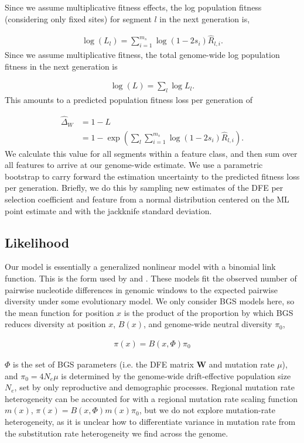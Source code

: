\documentclass[11pt]{article}
\begin{document}
Since we assume multiplicative fitness effects, the log population fitness
(considering only fixed sites) for segment $l$ in the next generation is,

\begin{align}
    \log(L_{l}) = \sum_{i=1}^{m_s} \log(1-2 s_i) \widehat{R}_{l,i}.
\end{align}
%
Since we assume multiplicative fitness, the total genome-wide log population
fitness in the next generation is

\begin{align}
    \log(L) = \sum_{l} \log{L_l}.
\end{align}
%
This amounts to a predicted population fitness loss per generation of

\begin{align}
    \widehat{\Delta}_W &= 1 - L \\  \nonumber
             &= 1 - \exp\left(\sum_{l} \sum_{i=1}^{m_s} \log(1-2s_i) \widehat{R}_{l,i} \right).
\end{align}
%
We calculate this value for all segments within a feature class, and then sum
over all features to arrive at our genome-wide estimate. We use a parametric
bootstrap to carry forward the estimation uncertainty to the predicted fitness
loss per generation. Briefly, we do this by sampling new estimates of the DFE
per selection coefficient and feature from a normal distribution centered on
the ML point estimate and with the jackknife standard deviation.

\subsection{Likelihood}
\label{supp:likelihood}

Our model is essentially a generalized nonlinear model with a binomial link
function. This is the form used by \textcite{Elyashiv2016-vt} and
\textcite{Murphy2022-sj}. These models fit the observed number of pairwise
nucleotide differences in genomic windows to the expected pairwise diversity
under some evolutionary model. We only consider BGS models here, so the mean
function for position $x$ is the product of the proportion by which BGS reduces
diversity at position $x$, $B(x)$, and genome-wide neutral diversity $\pi_0$,

\begin{align}
  \pi(x) = B(x, \Phi) \pi_0
\end{align}

$\Phi$ is the set of BGS parameters (i.e. the DFE matrix $\mathbf{W}$ and
mutation rate $\mu$), and $\pi_0 = 4 N_e \mu$ is determined by the genome-wide
drift-effective population size $N_e$, set by only reproductive and demographic
processes. Regional mutation rate heterogeneity can be accounted for with a
regional mutation rate scaling function $m(x)$, $\pi(x) = B(x, \Phi) m(x)
\pi_0$, but we do not explore mutation-rate heterogeneity, as it is unclear how
to differentiate variance in mutation rate from the substitution rate
heterogeneity we find across the genome.
\end{document}
